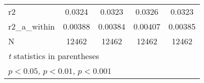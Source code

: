 {\begin{tabular}{l*{4}{c}}
\hline
r2          &      0.0324         &      0.0323         &      0.0326         &      0.0323         \\
r2\_a\_within &     0.00388         &     0.00384         &     0.00407         &     0.00385         \\
N           &       12462         &       12462         &       12462         &       12462         \\
\hline\hline
\multicolumn{5}{l}{\footnotesize \textit{t} statistics in parentheses}\\
\multicolumn{5}{l}{\footnotesize \sym{*} \(p<0.05\), \sym{**} \(p<0.01\), \sym{***} \(p<0.001\)}\\
\end{tabular}
}
